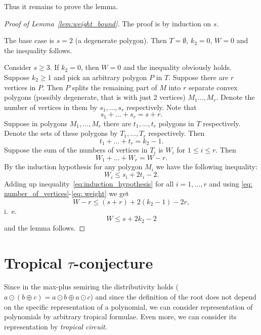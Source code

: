 \documentclass[11pt]{article}
\newcommand{\ta}{\oplus}
\newcommand{\tp}{\odot}
\begin{document}
Thus it remains to prove the lemma.
\begin{proof}[Proof of Lemma~\ref{lem:weight_bound}]

The proof is by induction on $s$.

The base case is $s=2$ (a degenerate polygon). Then $T = \emptyset$, $k_2=0$, $W=0$ and the inequality follows.

Consider $s\geq 3$. If $k_2=0$, then $W=0$ and the inequality obviously holds. Suppose $k_2\geq 1$ and pick an arbitrary polygon $P$ in $T$. Suppose there are $r$ vertices in $P$. Then $P$ splits the remaining part of $M$ into $r$ separate convex polygons (possibly degenerate, that is with just 2 vertices) $M_1\ldots, M_r$. Denote the number of vertices in them by $s_1,\ldots, s_r$ respectively. Note that 
\begin{equation}\label{eq: number_of_vertices}
s_1+\ldots+s_r=s+r.
\end{equation}
Suppose in polygons $M_1,\ldots, M_r$ there are $t_1,\ldots, t_r$ polygons in $T$ respectively. Denote the sets of these polygons by $T_1,\ldots, T_r$ respectively. Then
\begin{equation}\label{eq: number_of_regions}
t_1+\ldots+t_r=k_2-1.
\end{equation}
Suppose the sum of the numbers of vertices in $T_i$ is $W_i$ for $1 \leq i \leq r$. Then
\begin{equation}\label{eq: weight}
W_1+\ldots+W_r=W-r.
\end{equation}
By the induction hypothesis for any polygon $M_i$ we have the following inequality:
\begin{equation} \label{eq:induction_hypothesis}
W_i \leq s_i+2t_i -2.
\end{equation}
Adding up inequality~\eqref{eq:induction_hypothesis} for all $i=1,\ldots, r$ and using \eqref{eq: number_of_vertices}-\eqref{eq: weight} we get
$$
W-r \leq (s+r) +2(k_2-1) -2r,
$$
i.~e.
$$
W \leq s+2k_2-2
$$
and the lemma follows.
\end{proof}

\section{Tropical $\tau$-conjecture} \label{sec:tau}

Since in the max-plus semiring the distributivity holds ($a\tp (b \ta c) = a \tp b \ta a \tp c$) and since the definition of the root does not depend on the specific representation of a polynomial, we can consider representation of polynomials by arbitrary tropical formulae. Even more, we can consider its representation by \emph{tropical circuit}.
\end{document}

